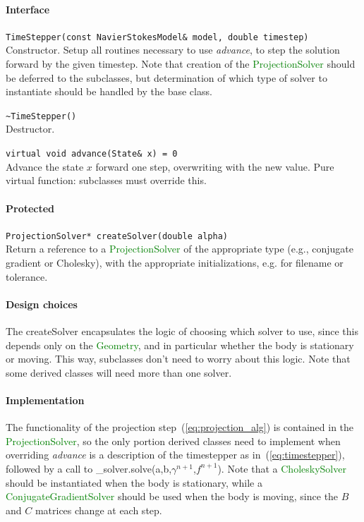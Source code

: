 \documentclass[11pt]{article}
\def\class#1{\textcolor{green}{\ttfamily\small #1}} %
\def\fn#1{{\ttfamily\small #1}} %
\def\virtualfn#1{{\ttfamily\small\slshape #1}} %
\let\code\lstinline
\begin{document}
\paragraph{Interface}
\begin{description}
	\item \code|TimeStepper(const NavierStokesModel& model, double timestep)|\\
		Constructor.  Setup all routines necessary to use \virtualfn{advance}, to step the solution forward by the given timestep.  Note that creation of the \class{ProjectionSolver} should be deferred to the subclasses, but determination of which type of solver to instantiate should be handled by the base class.
	\item \code|~TimeStepper()|\\
		Destructor.
	\item \code|virtual void advance(State& x) = 0|\\
	 	Advance the state $x$ forward one step, overwriting with the new value.  Pure virtual function: subclasses must override this.
\end{description}
\paragraph{Protected}
\begin{description}
	\item \code|ProjectionSolver* createSolver(double alpha)|\\
		Return a reference to a \class{ProjectionSolver} of the appropriate type (e.g., conjugate gradient or Cholesky), with the appropriate initializations, e.g. for filename or tolerance.
	\end{description}

\paragraph{Design choices}
The \fn{createSolver} encapsulates the logic of choosing which solver to use, since this depends only on the \class{Geometry}, and in particular whether the body is stationary or moving.  This way, subclasses don't need to worry about this logic.  Note that some derived classes will need more than one solver.

\paragraph{Implementation}
The functionality of the projection step~(\ref{eq:projection_alg}) is contained in the \class{ProjectionSolver}, so the only portion derived classes need to implement when overriding \virtualfn{advance} is a description of the timestepper as in~(\ref{eq:timestepper}), followed by a call to \fn{\_solver.solve}(a,b,$\gamma^{n+1}$,$f^{n+1}$).  Note that a \class{CholeskySolver} should be instantiated when the body is stationary, while a \class{ConjugateGradientSolver} should be used when the body is moving, since the $B$ and $C$ matrices change at each step.
\end{document}

